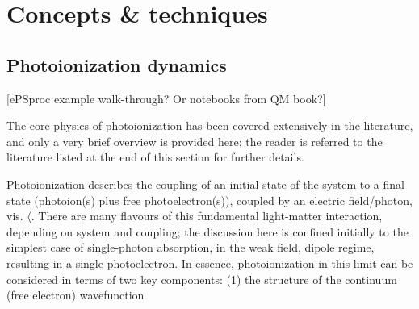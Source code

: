 \section{Concepts \& techniques}

\subsection{Photoionization dynamics} 
[ePSproc example walk-through? Or notebooks from QM book?]

The core physics of photoionization has been covered extensively in the literature, and only a very brief overview is provided here; the reader is referred to the literature listed at the end of this section for further details.

Photoionization describes the coupling of an initial state of the system to a final state (photoion(s) plus free photoelectron(s)), coupled by an electric field/photon, vis. $\langle$. There are many flavours of this fundamental light-matter interaction, depending on system and coupling; the discussion here is confined initially to the simplest case of single-photon absorption, in the weak field, dipole regime, resulting in a single photoelectron. In essence, photoionization in this limit can be considered in terms of two key components: (1) the structure of the continuum (free electron) wavefunction 
